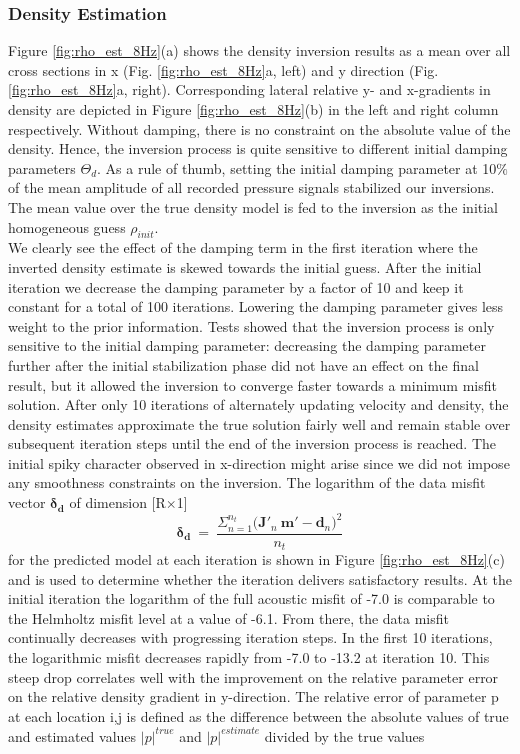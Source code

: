 \documentclass{article} %
\providecommand{\DIFdelbegin}{} %
\newcommand{\DIFscaledelfig}{0.5}
\newlength{\DIFdelgraphicswidth} %
\newlength{\DIFdelgraphicsheight} %
\newcommand{\DIFdelincludegraphics}[2][]{%
\sbox{\DIFdelgraphicsbox}{\DIFOincludegraphics[#1]{#2}}%
\settoboxwidth{\DIFdelgraphicswidth}{\DIFdelgraphicsbox} %
\settoboxtotalheight{\DIFdelgraphicsheight}{\DIFdelgraphicsbox} %
\scalebox{\DIFscaledelfig}{%
\parbox[b]{\DIFdelgraphicswidth}{\usebox{\DIFdelgraphicsbox}\\[-\baselineskip] \rule{\DIFdelgraphicswidth}{0em}}\llap{\resizebox{\DIFdelgraphicswidth}{\DIFdelgraphicsheight}{%
\setlength{\unitlength}{\DIFdelgraphicswidth}%
\begin{picture}(1,1)%
\thicklines\linethickness{2pt} %
{\color[rgb]{1,0,0}\put(0,0){\framebox(1,1){}}}%
{\color[rgb]{1,0,0}\put(0,0){\line( 1,1){1}}}%
{\color[rgb]{1,0,0}\put(0,1){\line(1,-1){1}}}%
\end{picture}%
}\hspace*{3pt}}} %
} %
\DeclareRobustCommand{\DIFdelbegin}{\DIFOdelbegin \let\includegraphics\DIFdelincludegraphics} %
\begin{document}
	\subsubsection*{Density Estimation} 

	Figure \ref{fig:rho_est_8Hz}(a) shows the density inversion results as a mean over all cross sections in x (Fig. \ref{fig:rho_est_8Hz}a, left) and y direction (Fig. \ref{fig:rho_est_8Hz}a, right). Corresponding lateral relative y- and x-gradients in density are depicted in Figure \ref{fig:rho_est_8Hz}(b) in the left and right column respectively. Without damping, there is no constraint on the absolute value of the density.  Hence, the inversion process is quite sensitive to different initial damping parameters $\Theta_{d}$. As a rule of thumb, setting the initial damping parameter at 10$\%$ of the mean amplitude of all recorded pressure signals stabilized our inversions. The mean value over the true density model is fed to the inversion as the initial homogeneous guess $\rho_{init}$. \\

	We clearly see the effect of the damping term in the first iteration where the inverted density estimate is skewed towards the initial guess. After the initial iteration we decrease the damping parameter by a factor of 10 and keep it constant for a total of 100 iterations. Lowering the damping parameter gives less weight to the prior information. Tests showed that the inversion process is only sensitive to the initial damping parameter: decreasing the damping parameter further after the initial stabilization phase did not have an effect on the final result, but it allowed the inversion to converge faster towards a minimum misfit solution. After only 10 iterations of alternately updating velocity and density, the density estimates approximate the true solution fairly well and remain stable over subsequent iteration steps until the end of the inversion process is reached. The initial spiky character observed in x-direction might arise since we did not impose any smoothness constraints on the inversion. The logarithm of the data misfit vector $\bm{\delta_{d}}$ of dimension [R$\times$1]
	\begin{equation}\label{eq:datamisfit}
		\bm{\delta_{d}} \: = \: \frac{\Sigma_{n=1}^{n_{t}} \big( \bm{J}'_{n} \: \bm{m}' - \bm{d}_{n} \big)^{2}}{n_{t}}
	\end{equation}
	for the predicted model at each iteration is shown in Figure \ref{fig:rho_est_8Hz}(c) and is used to determine whether the iteration delivers satisfactory results. At the initial iteration the logarithm of the full acoustic misfit of -7.0 is comparable to the Helmholtz misfit level at a value of -6.1. From there, the data misfit continually decreases with progressing iteration steps. In the first 10 iterations, the logarithmic misfit decreases rapidly from -7.0 to -13.2 at iteration 10. This steep drop correlates well with the improvement on the relative parameter error on the relative density gradient in y-direction. The relative error of parameter p at each location i,j is defined as the difference between the absolute values of true and estimated values $|p|^{true}$ and $|p|^{estimate}$ divided by the true values
	\DIFdelbegin %
\end{document}
